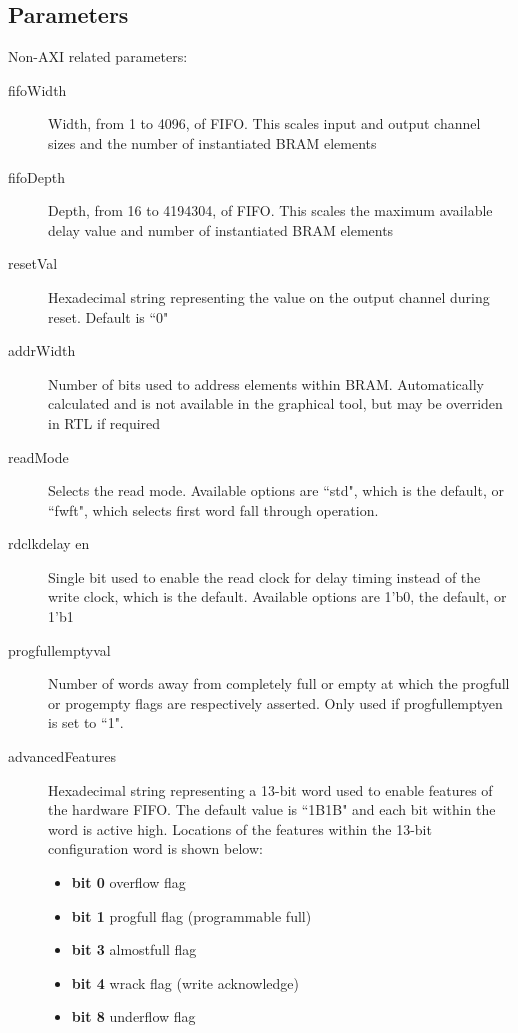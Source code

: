 \documentclass[11pt]{article}
\begin{document}
\subsection{Parameters}
Non-AXI related parameters:
\begin{description}
	\item[fifoWidth]Width, from 1 to 4096, of FIFO. This scales input and output channel sizes and the number of instantiated BRAM elements
	\item[fifoDepth]Depth, from 16 to 4194304, of FIFO. This scales the maximum available delay value and number of instantiated BRAM elements
	\item[resetVal]Hexadecimal string representing the value on the output channel during reset. Default is ``0"
	\item[addrWidth]Number of bits used to address elements within BRAM. Automatically calculated and is not available in the graphical tool, but may be
		overriden in RTL if required 
	\item[readMode]Selects the read mode. Available options are ``std", which is the default, or ``fwft", which selects first word fall through operation.
	\item[rd\textunderscore clk\textunderscore delay \textunderscore en]Single bit used to enable the read clock for delay timing instead of the write
		clock, which is the default. Available options are 1'b0, the default, or 1'b1
	\item[prog\textunderscore full\textunderscore empty\textunderscore val]Number of words away from completely full or empty at which the
		prog\textunderscore full or prog\textunderscore empty flags are respectively asserted. Only used if
		prog\textunderscore full\textunderscore empty\textunderscore en is set to ``1".
	\item[advancedFeatures]Hexadecimal string representing a 13-bit word used to enable features of the hardware FIFO. The default value is ``1B1B" and 
		each bit within the word is active high. Locations of the features within the 13-bit configuration word is shown below:
		\begin{itemize}
			\item\textbf{bit 0} overflow flag
			\item\textbf{bit 1} prog\textunderscore full flag (programmable full)
			\item\textbf{bit 3} almost\textunderscore full flag
			\item\textbf{bit 4} wr\textunderscore ack flag (write acknowledge)
			\item\textbf{bit 8} underflow flag

\end{itemize}
\end{description}
\end{document}
